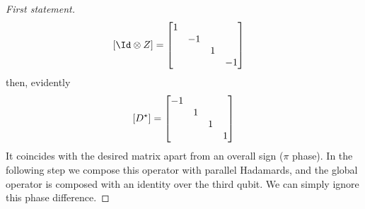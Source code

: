 \begin{proof}[First statement]
\[\begin{aligned}
        \lrS{\Id \otimes Z} &= \begin{bmatrix}
            1  & &  & \\
            & -1 &  & \\
            &  & 1  & \\
            &  & & -1
        \end{bmatrix}
    \end{aligned}
    \]
    then, evidently
    \[
        \left[{D^\star}\right] = \begin{bmatrix}
            -1 & & & \\
             & 1 & & \\
             & & 1 & \\
             & & & 1
        \end{bmatrix}
    \]
    It coincides with the desired matrix apart from an overall sign ($\pi$ phase). In the following step we compose this operator with parallel Hadamards, and the global operator is composed with an identity over the third qubit. We can simply ignore this phase difference.
\end{proof}

